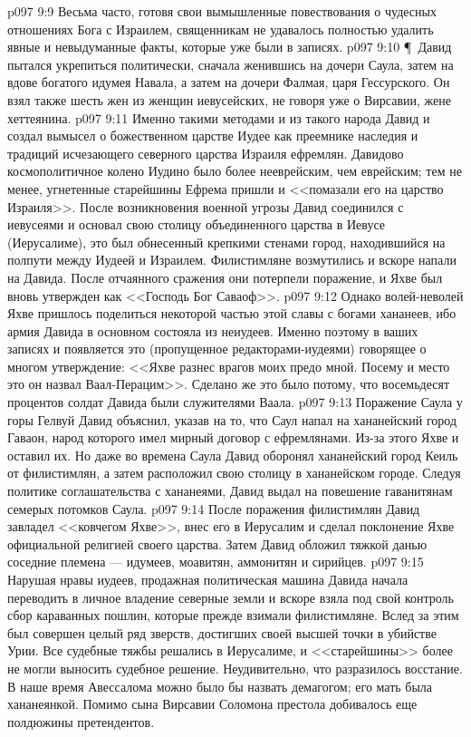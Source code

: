\vs p097 9:9 Весьма часто, готовя свои вымышленные повествования о чудесных отношениях Бога с Израилем, священникам не удавалось полностью удалить явные и невыдуманные факты, которые уже были в записях.
\vs p097 9:10 \P\ Давид пытался укрепиться политически, сначала женившись на дочери Саула, затем на вдове богатого идумея Навала, а затем на дочери Фалмая, царя Гессурского. Он взял также шесть жен из женщин иевусейских, не говоря уже о Вирсавии, жене хеттеянина.
\vs p097 9:11 Именно такими методами и из такого народа Давид и создал вымысел о божественном царстве Иудее как преемнике наследия и традиций исчезающего северного царства Израиля ефремлян. Давидово космополитичное колено Иудино было более нееврейским, чем еврейским; тем не менее, угнетенные старейшины Ефрема пришли и <<помазали его на царство Израиля>>. После возникновения военной угрозы Давид соединился с иевусеями и основал свою столицу объединенного царства в Иевусе (Иерусалиме), это был обнесенный крепкими стенами город, находившийся на полпути между Иудеей и Израилем. Филистимляне возмутились и вскоре напали на Давида. После отчаянного сражения они потерпели поражение, и Яхве был вновь утвержден как <<Господь Бог Саваоф>>.
\vs p097 9:12 Однако волей\hyp{}неволей Яхве пришлось поделиться некоторой частью этой славы с богами хананеев, ибо армия Давида в основном состояла из неиудеев. Именно поэтому в ваших записях и появляется это (пропущенное редакторами\hyp{}иудеями) говорящее о многом утверждение: <<Яхве разнес врагов моих предо мной. Посему и место это он назвал Ваал\hyp{}Перацим>>. Сделано же это было потому, что восемьдесят процентов солдат Давида были служителями Ваала.
\vs p097 9:13 Поражение Саула у горы Гелвуй Давид объяснил, указав на то, что Саул напал на хананейский город Гаваон, народ которого имел мирный договор с ефремлянами. Из\hyp{}за этого Яхве и оставил их. Но даже во времена Саула Давид оборонял хананейский город Кеиль от филистимлян, а затем расположил свою столицу в хананейском городе. Следуя политике соглашательства с хананеями, Давид выдал на повешение гаванитянам семерых потомков Саула.
\vs p097 9:14 После поражения филистимлян Давид завладел <<ковчегом Яхве>>, внес его в Иерусалим и сделал поклонение Яхве официальной религией своего царства. Затем Давид обложил тяжкой данью соседние племена --- идумеев, моавитян, аммонитян и сирийцев.
\vs p097 9:15 Нарушая нравы иудеев, продажная политическая машина Давида начала переводить в личное владение северные земли и вскоре взяла под свой контроль сбор караванных пошлин, которые прежде взимали филистимляне. Вслед за этим был совершен целый ряд зверств, достигших своей высшей точки в убийстве Урии. Все судебные тяжбы решались в Иерусалиме, и <<старейшины>> более не могли выносить судебное решение. Неудивительно, что разразилось восстание. В наше время Авессалома можно было бы назвать демагогом; его мать была хананеянкой. Помимо сына Вирсавии Соломона престола добивалось еще полдюжины претендентов.
